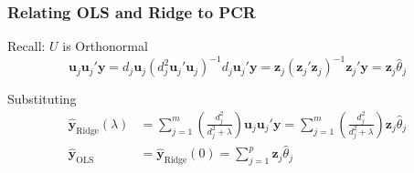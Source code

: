 %
%
%
%
\begin{frame}
  \frametitle{Relating OLS and Ridge to PCR}

  \begin{block}{Recall: $U$ is Orthonormal}
    \vspace{-1em}
      \[
        \mathbf{u}_j\mathbf{u}_j'\mathbf{y}  =
        d_j \mathbf{u}_j\left( d_j^2 \mathbf{u}_j' \mathbf{u}_j \right)^{-1} d_j \mathbf{u}_j'\mathbf{y} =
        \mathbf{z}_j(\mathbf{z}_j'\mathbf{z}_j)^{-1}\mathbf{z}_j' \mathbf{y} = \mathbf{z}_j \widehat{\theta}_j
      \]
\end{block}

\begin{alertblock}{Substituting}
  \vspace{-1em}
  \begin{align*}
        \widehat{\mathbf{y}}_{\text{Ridge}}(\lambda) &= \sum_{j=1}^m \left( \frac{d_j^2}{d_j^2 + \lambda} \right) \mathbf{u}_j \mathbf{u}_j' \mathbf{y} = \sum_{j=1}^m \left( \frac{d_j^2}{d_j^2 + \lambda} \right) \mathbf{z}_j \widehat{\theta}_j \\
        \widehat{\mathbf{y}}_{\text{OLS}} &= \widehat{\mathbf{y}}_{\text{Ridge}}(0) = \sum_{j=1}^p \mathbf{z}_j \widehat{\theta}_j 
      \end{align*}
    \end{alertblock}

\end{frame}
